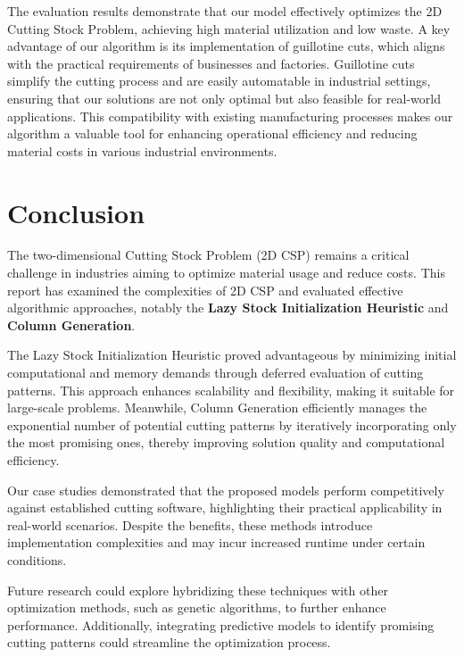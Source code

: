 \documentclass[a4paper]{article}
\begin{document}
\noindent The evaluation results demonstrate that our model effectively optimizes the 2D Cutting Stock Problem, achieving high material utilization and low waste. A key advantage of our algorithm is its implementation of guillotine cuts, which aligns with the practical requirements of businesses and factories. Guillotine cuts simplify the cutting process and are easily automatable in industrial settings, ensuring that our solutions are not only optimal but also feasible for real-world applications. This compatibility with existing manufacturing processes makes our algorithm a valuable tool for enhancing operational efficiency and reducing material costs in various industrial environments.
\section{Conclusion}

The two-dimensional Cutting Stock Problem (2D CSP) remains a critical challenge in industries aiming to optimize material usage and reduce costs. This report has examined the complexities of 2D CSP and evaluated effective algorithmic approaches, notably the \textbf{Lazy Stock Initialization Heuristic} and \textbf{Column Generation}.

\vspace{0.4cm}

\noindent The Lazy Stock Initialization Heuristic proved advantageous by minimizing initial computational and memory demands through deferred evaluation of cutting patterns. This approach enhances scalability and flexibility, making it suitable for large-scale problems. Meanwhile, Column Generation efficiently manages the exponential number of potential cutting patterns by iteratively incorporating only the most promising ones, thereby improving solution quality and computational efficiency.

\vspace{0.4cm}

\noindent Our case studies demonstrated that the proposed models perform competitively against established cutting software, highlighting their practical applicability in real-world scenarios. Despite the benefits, these methods introduce implementation complexities and may incur increased runtime under certain conditions.

\vspace{0.4cm}

\noindent Future research could explore hybridizing these techniques with other optimization methods, such as genetic algorithms, to further enhance performance. Additionally, integrating predictive models to identify promising cutting patterns could streamline the optimization process.
\end{document}
